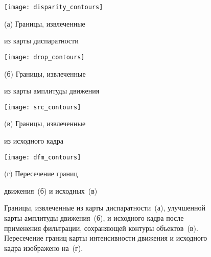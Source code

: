 \begin{figure}[t]
	\begin{minipage}[b]{0.49\linewidth}
		\centering
		\centerline{\texttt{[image: disparity\_contours]} }
		\centerline{(а) Границы, извлеченные}
		\centerline{из карты диспаратности}\medskip
	\end{minipage}
	\begin{minipage}[b]{0.49\linewidth}
		\centering
		\centerline{ \texttt{[image: drop\_contours]} }
		\centerline{(б) Границы, извлеченные}
		\centerline{из карты амплитуды движения}\medskip
	\end{minipage}
	\hfill
	\begin{minipage}[b]{0.49\linewidth}
		\centering
		\centerline{ \texttt{[image: src\_contours]} }
		\centerline{(в) Границы, извлеченные}
		\centerline{из исходного кадра}\medskip
	\end{minipage}
	\hfill
	\begin{minipage}[b]{0.49\linewidth}
		\centering
		\centerline{\texttt{[image: dfm\_contours]} }
		\centerline{(г) Пересечение границ}\medskip
		\centerline{движения~(б) и исходных~(в)}\medskip
	\end{minipage}
	\begin{minipage}[b]{\linewidth}
    \caption{Границы, извлеченные из карты диспаратности~(а), улучшенной карты
    	амплитуды движения~(б), и исходного кадра после применения фильтрации,
    	сохраняющей контуры объектов~(в). Пересечение границ карты интенсивности
    	движения и исходного кадра изображено на~(г).}
    \label{fig:edges}
    \end{minipage}
\end{figure}

